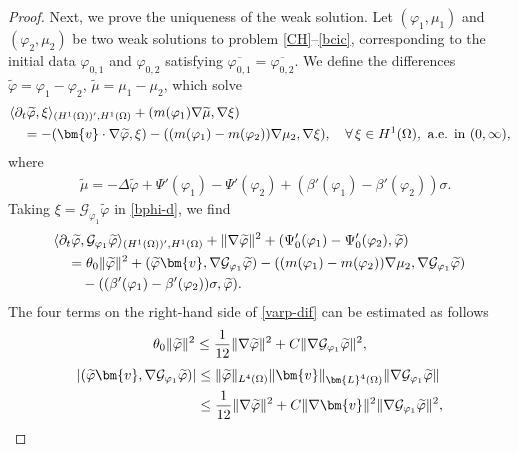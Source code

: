 \documentclass[11pt,reqno]{amsart}
\def\l{\langle}
\def\r{\rangle}
\def\vv{\bm{v}}
\begin{document}
\begin{proof}
Next, we prove the uniqueness of the weak solution. Let $(\varphi_1,\mu_1)$ and $(\varphi_2,\mu_2)$ be two weak solutions to problem \eqref{CH}--\eqref{bcic}, corresponding to the initial data $\varphi_{0,1}$ and $\varphi_{0,2}$ satisfying $\overline{\varphi_{0,1}}=\overline{\varphi_{0,2}}$.
We define the differences $\widetilde{\varphi}=\varphi_1-\varphi_2$, $\widetilde{\mu}=\mu_1-\mu_2$, which solve
\begin{align}
&\l \partial_t \widetilde{\varphi},\xi\r_{(H^1(\Omega))',H^1(\Omega)}
+ (m(\varphi_1)\nabla \widetilde{\mu}, \nabla \xi)
\notag\\
&\quad = - ( \vv\cdot \nabla \widetilde{\varphi},\xi)
-((m(\varphi_1)-m(\varphi_2))\nabla \mu_2, \nabla \xi),
\quad  \forall \, \xi \in H^1(\Omega), \ \text{a.e. in } (0,\infty),
\label{bphi-d}
\end{align}
where
\begin{align}
&\widetilde{\mu}=-\Delta \widetilde{\varphi} + \Psi'(\varphi_1)-\Psi'(\varphi_2) + (\beta'(\varphi_1)-\beta'(\varphi_2))\sigma.
\label{bmu-d}
\end{align}
%
Taking  $\xi= \mathcal{G}_{\varphi_1}\widetilde{\varphi}$ in \eqref{bphi-d}, we find
\begin{align}
&\l \partial_t \widetilde{\varphi},\mathcal{G}_{\varphi_1}\widetilde{\varphi} \r_{(H^1(\Omega))',H^1(\Omega)}
+ \|\nabla \widetilde{\varphi}\|^2 + (\Psi_0'(\varphi_1)-\Psi_0'(\varphi_2),\widetilde{\varphi})
\notag \\
&\quad = \theta_0 \|\widetilde{\varphi}\|^2
+ (\widetilde{\varphi}\vv,\nabla \mathcal{G}_{\varphi_1}\widetilde{\varphi}) -((m(\varphi_1)-m(\varphi_2))\nabla \mu_2, \nabla \mathcal{G}_{\varphi_1}\widetilde{\varphi})
\notag\\
&\qquad -((\beta'(\varphi_1)-\beta'(\varphi_2))\sigma,\widetilde{\varphi}).
\label{varp-dif}
\end{align}
The four terms on the right-hand side of \eqref{varp-dif} can be estimated as follows
\begin{align}
\theta_0 \|\widetilde{\varphi}\|^2 \leq \frac{1}{12}\|\nabla \widetilde{\varphi}\|^2+ C\|\nabla \mathcal{G}_{\varphi_1}\widetilde{\varphi}\|^2,
\notag
\end{align}
%
\begin{align}
\left|(\widetilde{\varphi}\vv,\nabla \mathcal{G}_{\varphi_1}\widetilde{\varphi})\right|
&\leq \|\widetilde{\varphi}\|_{L^4(\Omega)}\|\vv\|_{\bm{L}^4(\Omega)}\|\nabla \mathcal{G}_{\varphi_1}\widetilde{\varphi}\|
\notag \\
&\leq \frac{1}{12}\|\nabla \widetilde{\varphi}\|^2 + C\|\nabla \vv\|^2 \|\nabla \mathcal{G}_{\varphi_1}\widetilde{\varphi}\|^2,

\end{align}
\end{proof}
\end{document}
